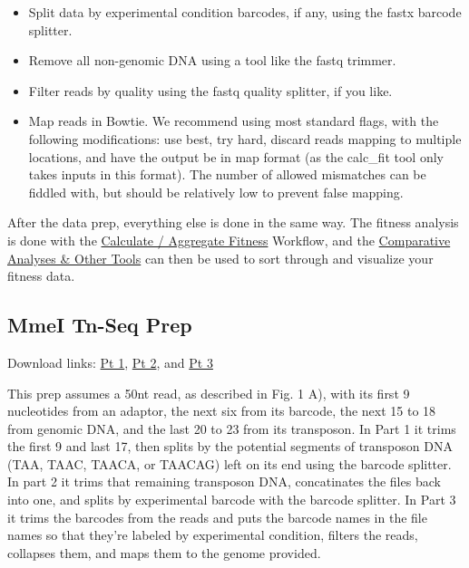 \documentclass{article}
\begin{document}
\begin{itemize}
\item Split data by experimental condition barcodes, if any, using the fastx barcode splitter.
\item Remove all non-genomic DNA using a tool like the fastq trimmer.
\item Filter reads by quality using the fastq quality splitter, if you like.
\item Map reads in Bowtie. We recommend using most standard flags, with the following modifications: use best, try hard, discard reads mapping to multiple locations, and have the output be in map format (as the calc\_fit tool only takes inputs in this format). The number of allowed mismatches can be fiddled with, but should be relatively low to prevent false mapping.

\end{itemize}

\vspace{2mm}

\noindent
After the data prep, everything else is done in the same way. The fitness analysis is done with the \hyperref[subsec:fitness]{Calculate / Aggregate Fitness} Workflow, and the \hyperref[subsec:comparative]{Comparative Analyses \& Other Tools} can then be used to sort through and visualize your fitness data.

\newpage

\subsection{MmeI Tn-Seq Prep}
\label{subsec:mmei}

\vspace{2 mm}

Download links: \href{https://github.com/vanOpijnenLab/magenta-p2/blob/master/workflows/Galaxy-Workflow-MmeI_Tn-Seq_Prep_Pt.1.ga}{Pt 1}, \href{https://github.com/vanOpijnenLab/magenta-p2/blob/master/workflows/Galaxy-Workflow-MmeI_Tn-Seq_Prep_Pt.2.ga}{Pt 2}, and \href{https://github.com/vanOpijnenLab/magenta-p2/blob/master/workflows/Galaxy-Workflow-MmeI_Tn-Seq_Prep_Pt.3.ga}{Pt 3}
\vspace{5 mm}

\noindent
    This prep assumes a 50nt read, as described in Fig. 1 A), with its first 9 nucleotides from an adaptor, the next six from its barcode, the next 15 to 18 from genomic DNA, and the last 20 to 23 from its transposon. In Part 1 it trims the first 9 and last 17, then splits by the potential segments of transposon DNA (TAA, TAAC, TAACA, or TAACAG) left on its end using the barcode splitter. In part 2 it trims that remaining transposon DNA, concatinates the files back into one, and splits by experimental barcode with the barcode splitter. In Part 3 it trims the barcodes from the reads and puts the barcode names in the file names so that they're labeled by experimental condition, filters the reads, collapses them, and maps them to the genome provided.
\end{document}
